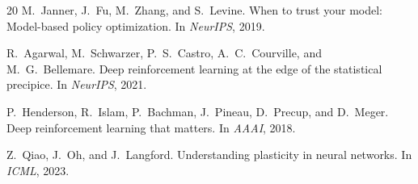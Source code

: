 \documentclass[10pt,letterpaper]{article}
\begin{document}
\begin{thebibliography}{20}
M.~Janner, J.~Fu, M.~Zhang, and S.~Levine.
\newblock When to trust your model: Model-based policy optimization.
\newblock In \emph{NeurIPS}, 2019.

R.~Agarwal, M.~Schwarzer, P.~S.~Castro, A.~C.~Courville, and M.~G.~Bellemare.
\newblock Deep reinforcement learning at the edge of the statistical precipice.
\newblock In \emph{NeurIPS}, 2021.

P.~Henderson, R.~Islam, P.~Bachman, J.~Pineau, D.~Precup, and D.~Meger.
\newblock Deep reinforcement learning that matters.
\newblock In \emph{AAAI}, 2018.

Z.~Qiao, J.~Oh, and J.~Langford.
\newblock Understanding plasticity in neural networks.
\newblock In \emph{ICML}, 2023.

\end{thebibliography}
\end{document}

